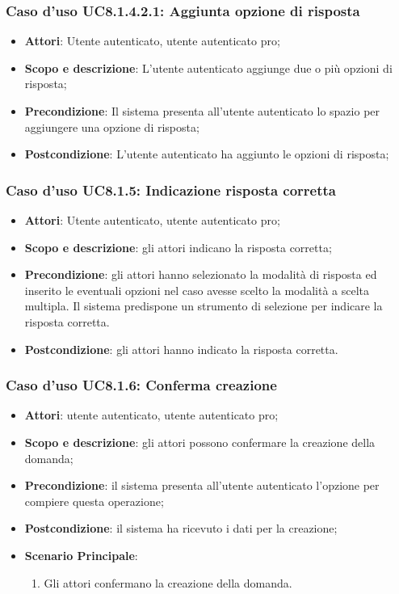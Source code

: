 	\subsubsection{Caso d'uso UC8.1.4.2.1: Aggiunta opzione di risposta}
		\begin{itemize}
		\item
			\textbf{Attori}: Utente autenticato, utente autenticato pro;
		\item
			\textbf{Scopo e descrizione}: L'utente autenticato aggiunge due o più opzioni di risposta;
		\item		
			\textbf{Precondizione}: Il sistema presenta all'utente autenticato lo spazio per aggiungere una opzione di risposta;
		\item		
			\textbf{Postcondizione}: L'utente autenticato ha aggiunto le opzioni di  risposta;
		\end{itemize}
	\subsubsection{Caso d'uso UC8.1.5: Indicazione risposta corretta}
		\begin{itemize}
		\item
			\textbf{Attori}: Utente autenticato, utente autenticato pro;
		\item
			\textbf{Scopo e descrizione}: gli attori indicano la risposta corretta;
		\item		
			\textbf{Precondizione}: gli attori hanno selezionato la modalità di risposta ed inserito le eventuali opzioni nel caso avesse scelto la modalità a scelta multipla. Il sistema predispone un strumento di selezione per indicare la risposta corretta.
		\item		
			\textbf{Postcondizione}: gli attori hanno indicato la risposta corretta.
		\end{itemize}
	\subsubsection{Caso d'uso UC8.1.6: Conferma creazione}
	\begin{itemize}
		\item
			\textbf{Attori}: utente autenticato, utente autenticato pro;
		\item
			\textbf{Scopo e descrizione}: gli attori possono confermare la creazione della domanda;
		\item		
			\textbf{Precondizione}: il sistema presenta all'utente autenticato l'opzione per compiere questa operazione;
		\item
			\textbf{Postcondizione}: il sistema ha ricevuto i dati per la creazione;
		\item
			\textbf{Scenario Principale}:  
					\begin{enumerate}
						\item
							Gli attori confermano la creazione della domanda.
					\end{enumerate}
	\end{itemize}	

